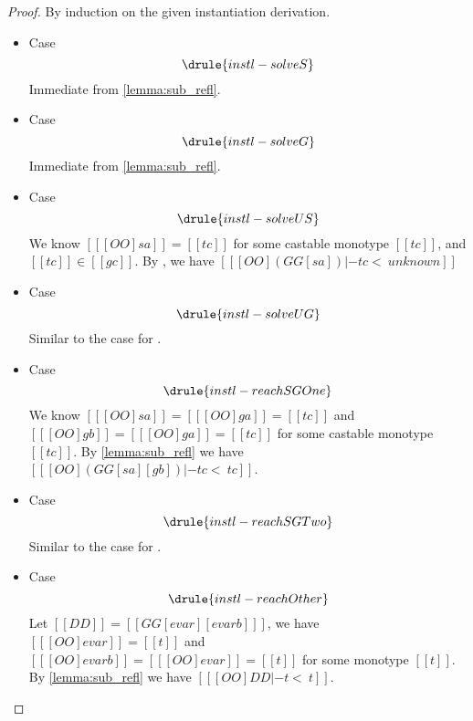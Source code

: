 \instsoundness*
\begin{proof}
  By induction on the given instantiation derivation.
  \begin{itemize}
  \item Case \[ \drule{instl-solveS} \] Immediate from \cref{lemma:sub_refl}.

  \item Case \[ \drule{instl-solveG} \] Immediate from \cref{lemma:sub_refl}.

  \item Case \[ \drule{instl-solveUS} \]
    We know $[[ [OO] sa ]] = [[tc]] $ for some castable monotype $[[tc]]$, and $[[tc]] \in [[gc]]$.
    By , we have $[[  [OO] (GG[sa]) |- tc <~ unknown  ]]$


  \item Case \[  \drule{instl-solveUG} \] Similar to the case for .

  \item Case \[ \drule{instl-reachSGOne}  \]
    We know $[[ [OO] sa ]] = [[ [OO]ga]] =  [[tc]] $ and $[[ [OO] gb  ]] = [[ [OO]ga]] = [[tc]]$ for some castable monotype $[[tc]]$.
    By \cref{lemma:sub_refl} we have $[[  [OO](GG[sa][gb] ) |- tc <~ tc   ]]$.

  \item Case \[  \drule{instl-reachSGTwo}   \] Similar to the case for .

  \item Case \[ \drule{instl-reachOther}  \]
    Let $[[DD]] = [[GG[evar][evarb]  ]]$, we have $[[ [OO]evar ]] = [[t]] $ and $[[  [OO] evarb  ]]  = [[  [OO] evar ]] = [[t]] $
    for some monotype $[[t]]$. By \cref{lemma:sub_refl} we have $[[ [OO]DD |- t <~ t  ]]$.


\end{itemize}
\end{proof}
